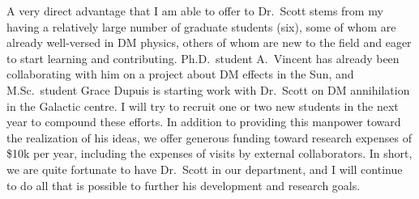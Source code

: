 \documentclass[12pt]{article}
\begin{document}
A very direct advantage that I am able to offer to Dr.\ Scott stems
from my having a relatively  large number of graduate students
(six), some of whom are already well-versed in DM physics,
others of whom are new to the field and eager to start learning and
contributing.  Ph.D.\ student A.\ Vincent has already been
collaborating with him on a project about DM effects in the
Sun, and M.Sc.\ student Grace Dupuis is starting work with Dr.\ Scott on
DM annihilation in the Galactic centre.  I will try to
recruit one or two new students in the next year to compound these
efforts.  In addition to
providing this manpower toward the realization of his ideas,
we offer generous funding toward research expenses of \$10k per year,
including the expenses of visits by external collaborators.  In short, we
are quite fortunate to have Dr.\ Scott in our department, and I will continue to do all
that is possible to further his development and research goals.



\small 
\end{document}
